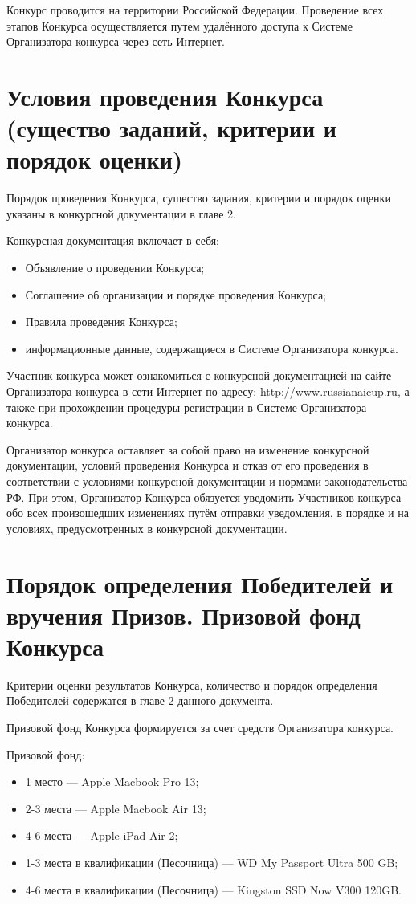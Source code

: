 Конкурс проводится на территории Российской Федерации. Проведение всех этапов Конкурса осуществляется путем удалённого доступа к Системе
Организатора конкурса через сеть Интернет.

\section{Условия проведения Конкурса (существо заданий, критерии и порядок оценки)}

Порядок проведения Конкурса, существо задания, критерии и порядок оценки указаны в конкурсной документации в главе 2.

Конкурсная документация включает в себя:
\begin{itemize}
\item Объявление о проведении Конкурса;
\item Соглашение об организации и порядке проведения Конкурса;
\item Правила проведения Конкурса;
\item информационные данные, содержащиеся в Системе Организатора конкурса.
\end{itemize}

Участник конкурса может ознакомиться с конкурсной документацией на сайте Организатора конкурса в сети Интернет по адресу:
http://www.russianaicup.ru, а также при прохождении процедуры регистрации в Системе Организатора конкурса.

Организатор конкурса оставляет за собой право на изменение конкурсной документации, условий проведения Конкурса и отказ от его проведения в
соответствии с условиями конкурсной документации и нормами законодательства РФ. При этом, Организатор Конкурса обязуется уведомить
Участников конкурса обо всех произошедших изменениях путём отправки уведомления, в порядке и на условиях, предусмотренных в конкурсной
документации.

\section{Порядок определения Победителей и вручения Призов. Призовой фонд Конкурса}

Критерии оценки результатов Конкурса, количество и порядок определения Победителей содержатся в главе 2 данного документа.

Призовой фонд Конкурса формируется за счет средств Организатора конкурса.

Призовой фонд:
\begin{itemize}
\item 1 место --- Apple Macbook Pro 13\textquotedbl;
\item 2-3 места --- Apple Macbook Air 13\textquotedbl;
\item 4-6 места --- Apple iPad Air 2;
\item 1-3 места в квалификации (Песочница) --- WD My Passport Ultra 500 GB;
\item 4-6 места в квалификации (Песочница) --- Kingston SSD Now V300 120GB.
\end{itemize}

